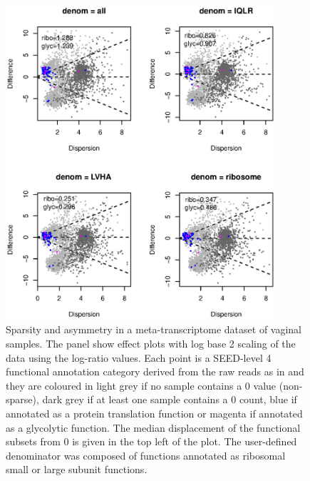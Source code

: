 \documentclass[graybox]{svmult}
\providecommand{\DIFdelbegin}{} %
\providecommand{\DIFaddbeginFL}{} %
\providecommand{\DIFaddendFL}{} %
\providecommand{\DIFdelbeginFL}{} %
\providecommand{\DIFdelendFL}{} %
\begin{document}
%
\DIFdelbegin %
\DIFdelendFL \DIFaddbeginFL \begin{figure}[!b]
\DIFaddendFL \sidecaption[t]
\DIFdelbeginFL %
\DIFdelendFL \DIFaddbeginFL \includegraphics[width=10cm]{MAx4-book.eps}
\DIFaddendFL %
%
\caption{Sparsity and asymmetry in a meta-transcriptome dataset of vaginal samples.  The panel show effect plots with log base 2 scaling of the data using the log-ratio values. Each point is a SEED-level 4 functional annotation category derived from the raw reads as in \cite{Macklaim:2018aa} and they are coloured in light grey if no sample contains a 0 value (non-sparse), dark grey if at least one sample contains a 0 count, blue if annotated as a protein translation function or magenta if annotated as a glycolytic function. The median displacement of the functional subsets from 0 is given in the top left of the plot.  The user-defined denominator was composed of functions annotated as ribosomal small or large subunit functions.  }
\label{Fig:f3a}       %
\end{figure}
\end{document}
